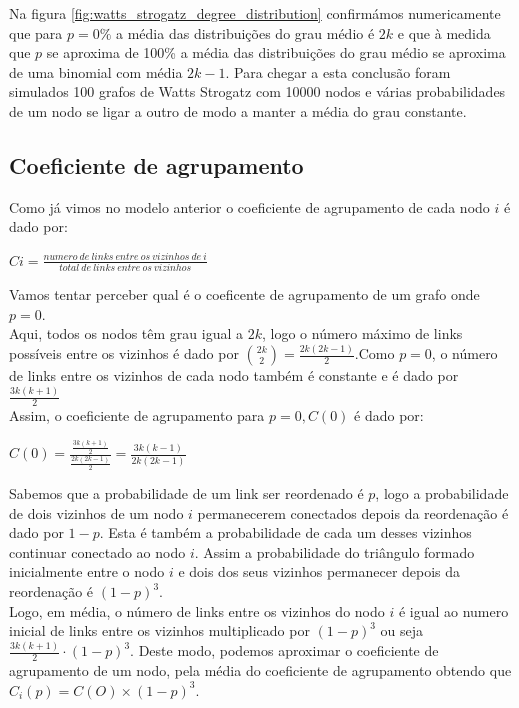 \documentclass[conference, twocolumn]{IEEEtran}
\theoremstyle{plain}
\theoremstyle{definition}
\theoremstyle{remark}
\begin{document}
Na figura \ref{fig:watts_strogatz_degree_distribution} confirmámos numericamente que para $p = 0\%$ a média das distribuições do grau médio é $2k$ e que à medida que $p$ se aproxima de 100\% a média das distribuições do grau médio se aproxima de uma binomial com média $2k - 1$. Para chegar a esta conclusão foram simulados 100 grafos de Watts Strogatz com 10000 nodos e várias probabilidades de um nodo se ligar a outro de modo a manter a média do grau constante.

\subsection{Coeficiente de agrupamento}
Como já vimos no modelo anterior o coeficiente de agrupamento de cada nodo $i$ é dado por:\\
\begin{center}
    $Ci = \frac{numero\ de\ links\ entre\ os\ vizinhos\ de\ i}{total\ de\ links\ entre\ os\ vizinhos}$
\end{center}
Vamos tentar perceber qual é o coeficente de agrupamento de um grafo onde $p=0$.\\
Aqui, todos os nodos têm grau igual a $2k$, logo o número máximo de links possíveis entre os vizinhos é dado por $\binom{2k}{2} = \frac{2k(2k-1)}{2}$.Como $p=0$, o número de links entre os vizinhos de cada nodo também é constante e é dado por $\frac{3k(k+1)}{2}$\\
Assim, o coeficiente de agrupamento para $p=0, C(0)$ é dado por:

\begin{center}
    $C(0) = \frac{\frac{3k(k+1)}{2}}{\frac{2k(2k-1)}{2}}=\frac{3k(k-1)}{2k(2k-1)}$
\end{center}

Sabemos que a probabilidade de um link ser reordenado é $p$, logo a probabilidade de dois vizinhos de um nodo $i$ permanecerem conectados depois da reordenação é dado por $1-p$. Esta é também a probabilidade de cada um desses vizinhos continuar conectado ao nodo $i$. Assim a probabilidade do triângulo formado inicialmente entre o nodo $i$ e dois dos seus vizinhos permanecer depois da reordenação é $(1-p)^3$.\\ Logo, em média, o número de links entre os vizinhos do nodo $i$  é igual ao numero inicial de links entre os vizinhos multiplicado por $(1-p)^{3}$ ou seja $\frac{3k(k+1)}{2}\cdot (1-p)^{3}$. Deste modo, podemos aproximar o coeficiente de agrupamento de um nodo, pela média do coeficiente de agrupamento obtendo que $C_{i}(p)= C(O)\times (1-p)^{3}$.
\end{document}

